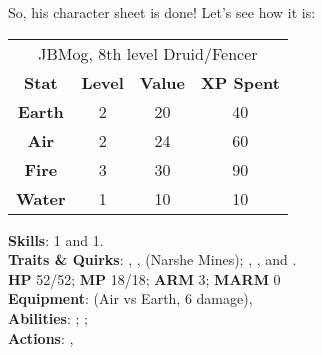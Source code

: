 \begin{multimog}
So, his character sheet is done! Let's see how it is:
\begin{center}
 \label{tab:jbmog}
  \begin{tabular}{cccc}
    \toprule
    \multicolumn{4}{c}{JBMog, 8th level Druid/Fencer} \\
    \textbf{Stat}  & \textbf{Level} & \textbf{Value} & \textbf{XP Spent} \\ \midrule
    \textbf{Earth} & 2              & 20             & 40                \\
    \textbf{Air}   & 2              & 24             & 60                \\
    \textbf{Fire}  & 3              & 30             & 90                \\
    \textbf{Water} & 1              & 10             & 10                \\ \bottomrule
  \end{tabular}
\end{center}

\noindent \textbf{Skills}:  1 and  1.\\
\textbf{Traits \& Quirks}: , ,  (Narshe Mines); , , and .\\
\textbf{HP} 52/52; \textbf{MP} 18/18; \textbf{ARM} 3; \textbf{MARM} 0\\
\textbf{Equipment}:  (Air vs Earth, 6 damage), \\
\textbf{Abilities}: ; ; \\
\textbf{Actions}: , 
\end{multimog}